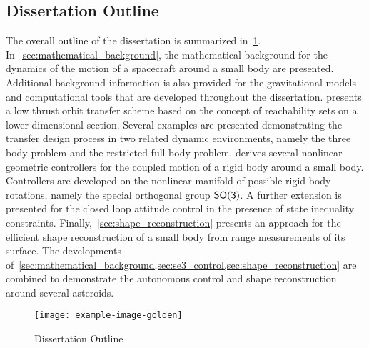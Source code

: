 \subsection{Dissertation Outline}

The overall outline of the dissertation is summarized in~\cref{fig:dissertation_outline}.
In~\cref{sec:mathematical_background}, the mathematical background for the dynamics of the motion of a spacecraft around a small body are presented. 
Additional background information is also provided for the gravitational models and computational tools that are developed throughout the dissertation.
 presents a low thrust orbit transfer scheme based on the concept of reachability sets on a lower dimensional \Poincare section.
Several examples are presented demonstrating the transfer design process in two related dynamic environments, namely the three body problem and the restricted full body problem.
 derives several nonlinear geometric controllers for the coupled motion of a rigid body around a small body.
Controllers are developed on the nonlinear manifold of possible rigid body rotations, namely the special orthogonal group \( \mathsf{SO(3)} \).
A further extension is presented for the closed loop attitude control in the presence of state inequality constraints.
Finally,~\cref{sec:shape_reconstruction} presents an approach for the efficient shape reconstruction of a small body from range measurements of its surface.
The developments of~\cref{sec:mathematical_background,sec:se3_control,sec:shape_reconstruction} are combined to demonstrate the autonomous control and shape reconstruction around several asteroids.

\begin{figure}[htbp]
    \centering
    \texttt{[image: example-image-golden]}
    \caption{Dissertation Outline\label{fig:dissertation_outline}}
\end{figure}




